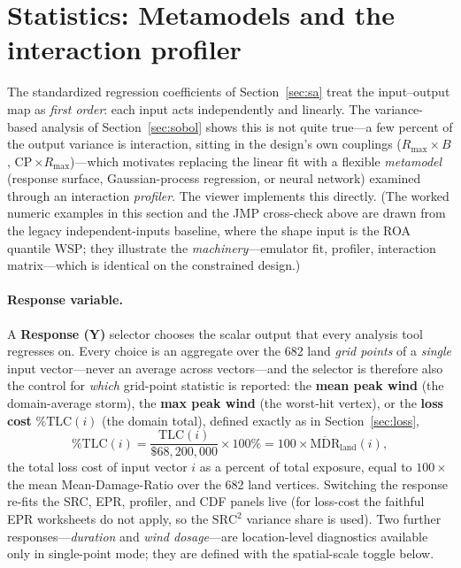 \documentclass[11pt]{article}
\begin{document}
\section{Statistics: Metamodels and the interaction profiler}\label{sec:metamodel}
The standardized regression coefficients of Section~\ref{sec:sa} treat the
input--output map as \emph{first order}: each input acts independently and
linearly. The variance-based analysis of Section~\ref{sec:sobol} shows this is not
quite true---a few percent of the output variance is interaction, sitting in the
design's own couplings ($R_{\max}\times B$, CP\,$\times R_{\max}$)---which motivates
replacing the linear fit with a flexible \emph{metamodel} (response surface,
Gaussian-process regression, or neural network) examined through an interaction
\emph{profiler}. The viewer implements this directly. (The worked numeric examples in
this section and the JMP cross-check above are drawn from the legacy independent-inputs
baseline, where the shape input is the ROA quantile WSP; they illustrate the
\emph{machinery}---emulator fit, profiler, interaction matrix---which is identical on
the constrained design.)

\paragraph{Response variable.}
A \textbf{Response (Y)} selector chooses the scalar output that every analysis
tool regresses on. Every choice is an aggregate over the 682 land \emph{grid
points} of a \emph{single} input vector---never an average across vectors---and the
selector is therefore also the control for \emph{which} grid-point statistic is
reported: the \textbf{mean peak wind} (the domain-average storm), the \textbf{max
peak wind} (the worst-hit vertex), or the \textbf{loss cost} $\%\text{TLC}(i)$ (the
domain total), defined exactly as in Section~\ref{sec:loss},
\[
\%\text{TLC}(i)=\frac{\text{TLC}(i)}{\$68{,}200{,}000}\times100\%
=100\times\overline{\text{MDR}}_{\text{land}}(i),
\]
the total loss cost of input vector $i$ as a percent of total exposure, equal to
$100\times$ the mean Mean-Damage-Ratio over the 682 land vertices. Switching the
response re-fits the SRC, EPR, profiler, and CDF panels live (for loss-cost the
faithful EPR worksheets do not apply, so the $\text{SRC}^2$ variance share is
used). Two further responses---\emph{duration} and \emph{wind dosage}---are
location-level diagnostics available only in single-point mode; they are defined
with the spatial-scale toggle below.
\end{document}
